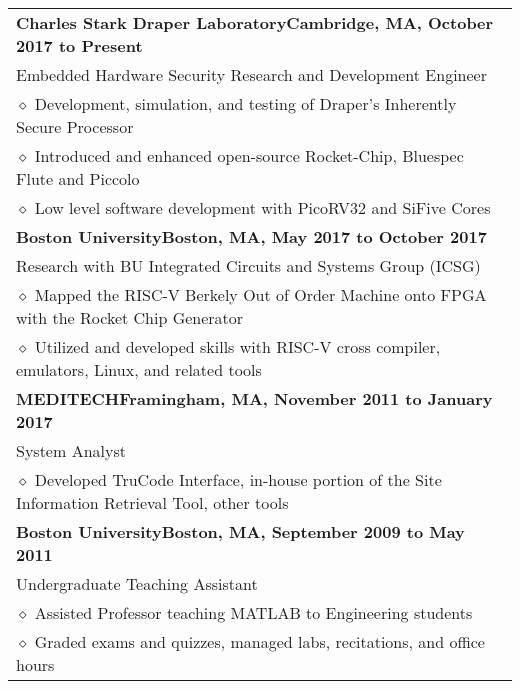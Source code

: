 \documentclass[10.5pt,letterpaper]{article}
\newcommand{\org}[1]{\textbf{#1}}
\newcommand{\pseudoitem}{\diamond}
\newcommand{\horzindent}{\hspace{3mm}}
\newcommand{\minorindent}{\hspace{4.5mm}}
\newcommand{\minoritem}{\minorindent $\pseudoitem$ }
\newcommand{\tablewidth}{.9\linewidth}
\newcommand{\undergrad}{Boston University}
\newcommand{\grad}{Boston University}
\begin{document}
		\begin{tabular*}{\tablewidth}{@{\extracolsep{\fill}}l}
		    \org{Charles Stark Draper Laboratory}\hfill \textbf{Cambridge, MA, October 2017 to Present}\\
		    \horzindent Embedded Hardware Security Research and Development Engineer\\
		    \minoritem Development, simulation, and testing of Draper's Inherently Secure Processor \\
                    \minoritem Introduced and enhanced open-source Rocket-Chip, Bluespec Flute and Piccolo \\
		    \minoritem Low level software development with PicoRV32 and SiFive Cores\\	    
		    \org{\grad}\hfill \textbf{Boston, MA, May 2017 to October 2017}\\
		    \horzindent Research with BU Integrated Circuits and Systems Group (ICSG)\\
		    \minoritem Mapped the RISC-V Berkely Out of Order Machine onto FPGA with the Rocket Chip Generator\\
		    \minoritem Utilized and developed skills with RISC-V cross compiler, emulators, Linux, and related tools\\
		    \org{MEDITECH}\hfill \textbf{Framingham, MA, November 2011 to January 2017}\\
		    \horzindent System Analyst \\
		    \minoritem Developed TruCode Interface, in-house portion of the Site Information Retrieval Tool, other tools \\
		    \org{\undergrad}\hfill \textbf{Boston, MA, September 2009 to May 2011}\\
		    \horzindent Undergraduate Teaching Assistant \\
        	    \minoritem Assisted Professor teaching MATLAB to Engineering students \\
		    \minoritem Graded exams and quizzes, managed labs, recitations, and office hours \\
		\end{tabular*}
	
\end{document}
